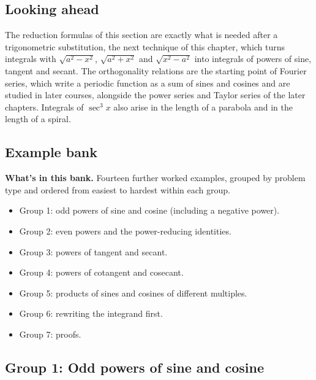 \documentclass[11pt]{article}
\begin{document}
\subsection*{Looking ahead}

The reduction formulas of this section are exactly what is needed after a trigonometric substitution, the next technique of this chapter, which turns integrals with $\sqrt{a^2-x^2}$, $\sqrt{a^2+x^2}$ and $\sqrt{x^2-a^2}$ into integrals of powers of sine, tangent and secant. The orthogonality relations are the starting point of Fourier series, which write a periodic function as a sum of sines and cosines and are studied in later courses, alongside the power series and Taylor series of the later chapters. Integrals of $\sec^3x$ also arise in the length of a parabola and in the length of a spiral.

\subsection*{Example bank}

\textbf{What's in this bank.} Fourteen further worked examples, grouped by problem type and ordered from easiest to hardest within each group.
\begin{itemize}[nosep]
  \item Group 1: odd powers of sine and cosine (including a negative power).
  \item Group 2: even powers and the power-reducing identities.
  \item Group 3: powers of tangent and secant.
  \item Group 4: powers of cotangent and cosecant.
  \item Group 5: products of sines and cosines of different multiples.
  \item Group 6: rewriting the integrand first.
  \item Group 7: proofs.
\end{itemize}

\subsection*{Group 1: Odd powers of sine and cosine}
\end{document}
